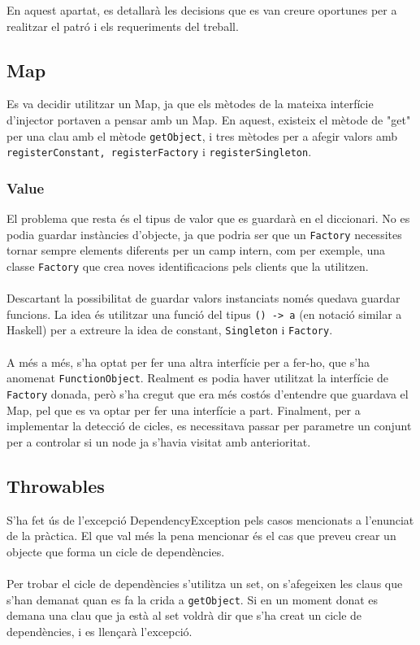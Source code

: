 
	En aquest apartat, es detallarà les decisions que es van creure oportunes per a realitzar el patró i els requeriments
	del treball.
\subsection{Map}
Es va decidir utilitzar un Map, ja que els mètodes de la mateixa interfície d'injector portaven a pensar amb un Map. En aquest, existeix
el mètode de "get" per una clau amb el mètode \texttt{getObject}, i tres mètodes per a afegir valors
amb \texttt{registerConstant, registerFactory} i \texttt{registerSingleton}.
\subsubsection{Value}
El problema que resta és el tipus de valor que es guardarà en el diccionari. No es podia guardar instàncies d'objecte, ja que podria
ser que un \texttt{Factory} necessites tornar sempre elements diferents per un camp intern, com per exemple, una classe
\texttt{Factory} que crea noves identificacions pels clients que la utilitzen.\\
\\
Descartant la possibilitat de guardar valors instanciats només quedava guardar funcions. La idea és utilitzar una
funció del tipus \texttt{() -> a} (en notació similar a Haskell) per a extreure
la idea de constant, \texttt{Singleton} i \texttt{Factory}.\\
\\
A més a més, s'ha optat per fer una altra interfície per a fer-ho, que s'ha anomenat \texttt{FunctionObject}. Realment
es podia haver utilitzat la interfície de \texttt{Factory} donada, però s'ha cregut que era més costós d'entendre que
guardava el Map, pel que es va optar per fer una interfície a part. Finalment, per a implementar la detecció
de cicles, es necessitava passar per parametre un conjunt per a controlar si un node ja s'havia visitat 
amb anterioritat.
\subsection{Throwables}
S'ha fet ús de l'excepció DependencyException pels casos mencionats a l'enunciat
de la pràctica. El que val més la pena mencionar és el cas que preveu crear un objecte
que forma un cicle de dependències.\\
\\
Per trobar el cicle de dependències s'utilitza un set, on s'afegeixen
les claus que s'han demanat quan es fa la crida a \texttt{getObject}. Si en un moment
donat es demana una clau que ja està al set voldrà dir que s'ha creat un cicle
de dependències, i es llençarà l'excepció.
